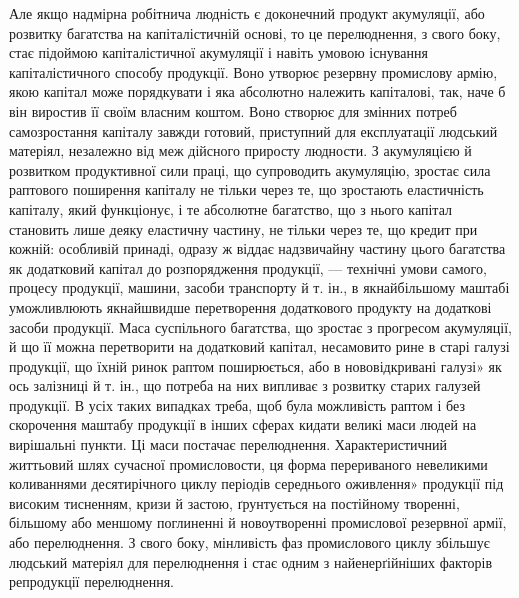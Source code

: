Але якщо надмірна робітнича людність є доконечний продукт
акумуляції, або розвитку багатства на капіталістичній основі,
то це перелюднення, з свого боку, стає підоймою капіталістичної
акумуляції і навіть умовою існування капіталістичного способу
продукції. Воно утворює резервну промислову армію, якою капітал
може порядкувати і яка абсолютно належить капіталові,
так, наче б він виростив її своїм власним коштом. Воно створює
для змінних потреб самозростання капіталу завжди готовий,
приступний для експлуатації людський матеріял, незалежно
від меж дійсного приросту людности. З акумуляцією й розвитком
продуктивної сили праці, що супроводить акумуляцію,
зростає сила раптового поширення капіталу не тільки через те,
що зростають еластичність капіталу, який функціонує, і те абсолютне
багатство, що з нього капітал становить лише деяку
еластичну частину, не тільки через те, що кредит при кожній:
особливій принаді, одразу ж віддає надзвичайну частину цього
багатства як додатковий капітал до розпорядження продукції,
— технічні умови самого, процесу продукції, машини, засоби
транспорту й т. ін., в якнайбільшому маштабі уможливлюють
якнайшвидше перетворення додаткового продукту на
додаткові засоби продукції. Маса суспільного багатства, що зростає
з прогресом акумуляції, й що її можна перетворити на додатковий
капітал, несамовито рине в старі галузі продукції, що
їхній ринок раптом поширюється, або в нововідкривані галузі»
як ось залізниці й т. ін., що потреба на них випливає з розвитку
старих галузей продукції. В усіх таких випадках треба, щоб була
можливість раптом і без скорочення маштабу продукції в інших
сферах кидати великі маси людей на вирішальні пункти. Ці
маси постачає перелюднення. Характеристичний життьовий шлях
сучасної промисловости, ця форма перериваного невеликими
коливаннями десятирічного циклу періодів середнього оживлення»
продукції під високим тисненням, кризи й застою, ґрунтується
на постійному творенні, більшому або меншому поглиненні й
новоутворенні промислової резервної армії, або перелюднення.
З свого боку, мінливість фаз промислового циклу збільшує
людський матеріял для перелюднення і стає одним з найенерґійніших
факторів репродукції перелюднення.

